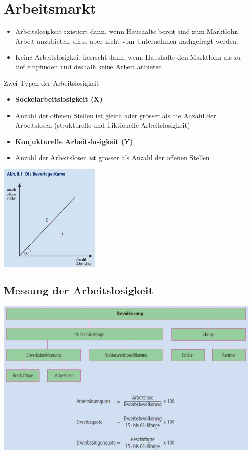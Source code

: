 \section{Arbeitsmarkt}
\begin{itemize}
	\item Arbeitslosigkeit existiert dann, wenn Haushalte bereit sind zum Marktlohn Arbeit anzubieten, diese aber nicht vom Unternehmen nachgefragt werden.
	\item Keine Arbeitslosigkeit herrscht dann, wenn Haushalte den Marktlohn als zu tief empfinden und deshalb keine Arbeit anbieten.
\end{itemize}
Zwei Typen der Arbeitslosigkeit\\
\begin{minipage}{12cm}
	\begin{itemize}
		\item \textbf{Sockelarbeitslosigkeit (X)}
		\item Anzahl der offenen Stellen ist gleich oder grösser als die Anzahl der Arbeitslosen (strukturelle und friktionelle Arbeitslosigkeit)
		\item \textbf{Konjukturelle Arbeitslosigkeit (Y)}
		\item Anzahl der Arbeitslosen ist grösser als Anzahl der offenen Stellen
	\end{itemize}
\end{minipage}
\begin{minipage}{5cm}
	\includegraphics[width=5cm]{images/beveridge.jpg}
\end{minipage}
\subsection{Messung der Arbeitslosigkeit}
\includegraphics[width=0.8\linewidth]{images/messung.jpg}
